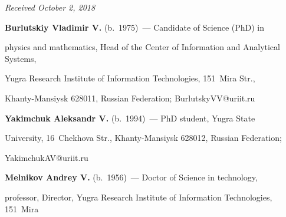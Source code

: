 




\hfill{\small\textit{Received October 2, 2018}}












  


  


  \Contr


  


  


  \noindent


  \textbf{Burlutskiy Vladimir V.} (b.\ 1975)~--- Candidate of Science (PhD) in 


physics and mathematics, Head of the Center of Information and Analytical Systems, 


Yugra Research Institute of Information Technologies, 151~Mira Str.,  


Khanty-Mansiysk 628011, Russian Federation; \mbox{BurlutskyVV@uriit.ru}


  


  \vspace*{3pt}


  


  \noindent


  \textbf{Yakimchuk Aleksandr V.} (b.\ 1994)~--- PhD student, Yugra State 


University, 16~Chekhova Str., Khanty-Mansiysk 628012, Russian Federation; 


\mbox{YakimchukAV@uriit.ru }


  


  \vspace*{3pt}


  


  \noindent


  \textbf{Melnikov Andrey V.} (b.\ 1956)~--- Doctor of Science in technology, 


professor, Director, Yugra Research Institute of Information Technologies, 151~Mira 


